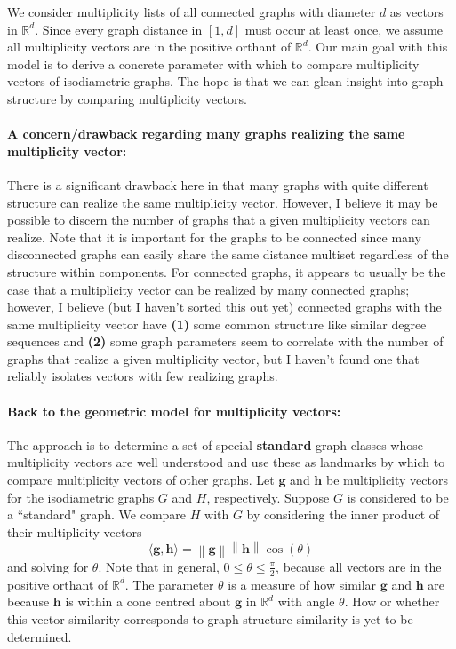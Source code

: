 \documentclass[12]{article}
\newcommand{\R}{\mathbb{R}}
\newcommand{\norm}[1]{\left\lVert #1 \right\rVert}
\theoremstyle{definition}
\begin{document}
	We consider multiplicity lists of all connected graphs with diameter $d$ as vectors in $\R^d$.  %
	Since every graph distance in $[1,d]$ must occur at least once, we assume all multiplicity vectors are in the positive orthant of $\R^d$.  Our main goal with this model is to derive a concrete parameter with which to compare multiplicity vectors of isodiametric graphs.  The hope is that we can glean insight into graph structure by comparing multiplicity vectors.
	
	\paragraph{A concern/drawback regarding many graphs realizing the same multiplicity vector: }There is a significant drawback here in that many graphs with quite different structure can realize the same multiplicity vector.  However, I believe it may be possible to discern the number of graphs that a given multiplicity vectors can realize.  Note that it is important for the graphs to be connected since many disconnected graphs can easily share the same distance multiset regardless of the structure within components.  For connected graphs, it appears to usually be the case that a multiplicity vector can be realized by many connected graphs; however, I believe (but I haven't sorted this out yet) connected graphs with the same multiplicity vector have \textbf{(1)} some common structure like similar degree sequences and \textbf{(2)} some graph parameters seem to correlate with the number of graphs that realize a given multiplicity vector, but I haven't found one that reliably isolates vectors with few realizing graphs.
	
	\paragraph{Back to the geometric model for multiplicity vectors:} The approach is to determine a set of special \textbf{standard} graph classes whose multiplicity vectors are well understood and use these as landmarks by which to compare multiplicity vectors of other graphs.  Let $\mathbf{g}$ and $\mathbf{h}$ be multiplicity vectors for the isodiametric graphs $G$ and $H$, respectively.  Suppose $G$ is considered to be a ``standard" graph.  We compare $H$ with $G$ by considering the inner product of their multiplicity vectors
	$$\langle \mathbf{g}, \mathbf{h} \rangle = \norm{\mathbf{g}} \norm{\mathbf{h}} \cos(\theta)$$
	and solving for $\theta$.  Note that in general, $0 \leq \theta \leq \tfrac{\pi}{2}$, because all vectors are in the positive orthant of $\R^d$.  The parameter $\theta$ is a measure of how similar $\mathbf{g}$ and $\mathbf{h}$ are because $\mathbf{h}$ is within a cone centred about $\mathbf{g}$ in $\R^d$ with angle $\theta$.  How or whether this vector similarity corresponds to graph structure similarity is yet to be determined.
\end{document}
